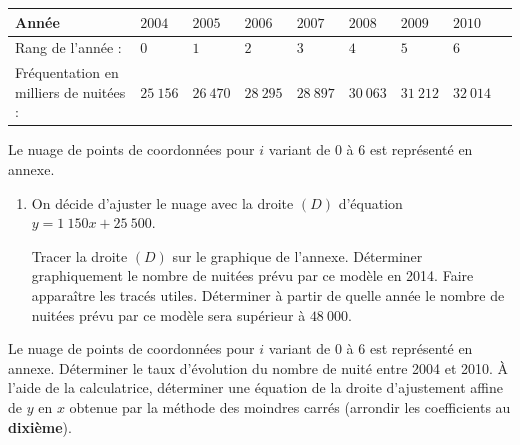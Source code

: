 {	\begin{center}
		\def\arraystretch{1.2}
		\begin{tabular}{|R{6cm}|*8{C{1cm}|}}\hline
			Année                                           & $2004$   & $2005$   & $2006$   & $2007$   & $2008$   & $2009$   & $2010$   \\ \hline
			Rang de l'année :                      & $0$      & $1$      & $2$      & $3$      & $4$      & $5$      & $6$      \\ \hline
			Fréquentation en milliers de nuitées :  & $25~156$ & $26~470$ & $28~295$ & $28~897$ & $30~063$ & $31~212$ & $32~014$ \\ \hline
		\end{tabular}
	\end{center}
	\vspace*{2mm}
	Le nuage de points de coordonnées  pour $i$ variant de $0$ à $6$ est représenté en  annexe.
	\vspace*{2mm}
	\begin{enumerate}
		 Déterminer le taux d'évolution du nombre de nuité entre 2004 et 2010.
		 À l'aide de la calculatrice, déterminer une équation de la droite d'ajustement affine de $y$ en $x$ obtenue par la méthode des moindres carrés (arrondir les coefficients au \textbf{dixième}).
		\item On décide d'ajuster le nuage avec la droite $(D)$ d'équation $y = 1~150x+25~500$.
		      \begin{enumerate}
			       Tracer la droite $(D)$ sur le graphique de l'annexe.
			       Déterminer graphiquement le nombre de nuitées prévu par ce modèle en 2014. Faire apparaître les tracés utiles.
			       Déterminer à partir de quelle année le nombre de nuitées prévu par ce modèle sera supérieur à $48~000$.
		      \end{enumerate}
	\end{enumerate}
	\vspace*{2mm}
	Le nuage de points de coordonnées  pour $i$ variant de $0$ à $6$ est représenté en  annexe.
	\vspace*{2mm}
	\beresume
	 Déterminer le taux d'évolution du nombre de nuité entre 2004 et 2010.
	 À l'aide de la calculatrice, déterminer une équation de la droite d'ajustement affine de $y$ en $x$ obtenue par la méthode des moindres carrés (arrondir les coefficients au \textbf{dixième}).
	\ee
}

\newpage~\newpage

